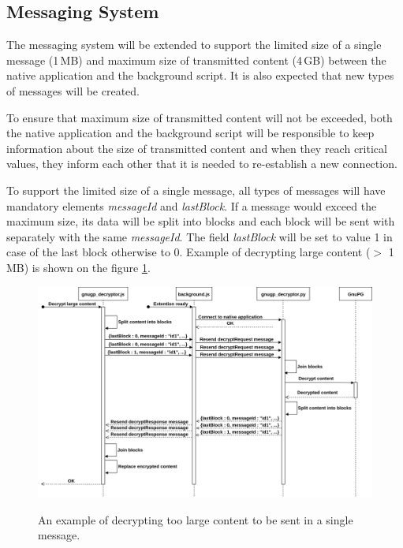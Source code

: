 \subsection{Messaging System}
The messaging system will be extended to support the limited size of a single message (1\,MB) and maximum size of transmitted content (4\,GB) between the native application and the background script. It is also expected that new types of messages will be created.

To ensure that maximum size of transmitted content will not be exceeded, both the native application and the background script will be responsible to keep information about the size of transmitted content and when they reach critical values, they inform each other that it is needed to re-establish a new connection.

To support the limited size of a single message, all types of messages will have mandatory elements \textit{messageId} and \textit{lastBlock}. If a message would exceed the maximum size, its data will be split into blocks and each block will be sent with separately with the same \textit{messageId}. The field \textit{lastBlock} will be set to value 1 in case of the last block otherwise to 0. Example of decrypting large content ($>$ 1\,MB) is shown on the figure \ref{img:messageDraft}.

\begin{figure}[H]
    \begin{center}
        \label{img:messageDraft}
        \includegraphics[width=1.3\textwidth,angle=90]{obrazky-figures/sequence-messageDesign.png}
        \caption{An example of decrypting too large content to be sent in a single message.}
    \end{center}
\end{figure}


